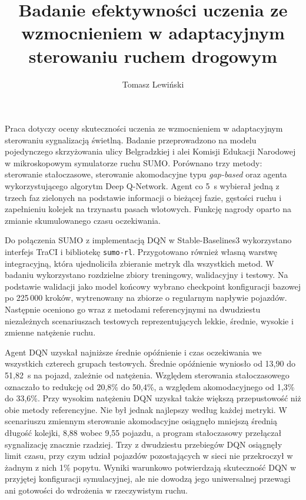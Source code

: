 \documentclass[
    bindingoffset=5mm,  %
    footnoteindent=3mm, %
    hyphenation=true    %
]{src/wut-thesis}
\begin{document}
\title{
    Badanie efektywności uczenia ze wzmocnieniem w adaptacyjnym sterowaniu ruchem drogowym
}

\author{Tomasz Lewiński}
\date{\the\year}
\maketitle

\cleardoublepage %
\abstract
Praca dotyczy oceny skuteczności uczenia ze wzmocnieniem w adaptacyjnym sterowaniu sygnalizacją świetlną. Badanie przeprowadzono na modelu pojedynczego skrzyżowania ulicy Belgradzkiej i alei Komisji Edukacji Narodowej w mikroskopowym symulatorze ruchu SUMO. Porównano trzy metody: sterowanie stałoczasowe, sterowanie akomodacyjne typu \textit{gap-based} oraz agenta wykorzystującego algorytm Deep Q-Network. Agent co 5~s wybierał jedną z trzech faz zielonych na podstawie informacji o bieżącej fazie, gęstości ruchu i zapełnieniu kolejek na trzynastu pasach wlotowych. Funkcję nagrody oparto na zmianie skumulowanego czasu oczekiwania.

Do połączenia SUMO z implementacją DQN w Stable-Baselines3 wykorzystano interfejs TraCI i bibliotekę \texttt{sumo-rl}. Przygotowano również własną warstwę integracyjną, która ujednoliciła zbieranie metryk dla wszystkich metod. W badaniu wykorzystano rozdzielne zbiory treningowy, walidacyjny i testowy. Na podstawie walidacji jako model końcowy wybrano checkpoint konfiguracji bazowej po 225\,000 kroków, wytrenowany na zbiorze o regularnym napływie pojazdów. Następnie oceniono go wraz z metodami referencyjnymi na dwudziestu niezależnych scenariuszach testowych reprezentujących lekkie, średnie, wysokie i zmienne natężenie ruchu.

Agent DQN uzyskał najniższe średnie opóźnienie i czas oczekiwania we wszystkich czterech grupach testowych. Średnie opóźnienie wyniosło od 13,90 do 51,82~s na pojazd, zależnie od natężenia. Względem sterowania stałoczasowego oznaczało to redukcję od 20,8\% do 50,4\%, a względem akomodacyjnego od 1,3\% do 33,6\%. Przy wysokim natężeniu DQN uzyskał także większą przepustowość niż obie metody referencyjne. Nie był jednak najlepszy według każdej metryki. W scenariuszu zmiennym sterowanie akomodacyjne osiągnęło mniejszą średnią długość kolejki, 8,88 wobec 9,55 pojazdu, a program stałoczasowy przełączał sygnalizację znacznie rzadziej. Trzy z dwudziestu przebiegów DQN osiągnęły limit czasu, przy czym udział pojazdów pozostających w sieci nie przekroczył w żadnym z nich 1\% popytu. Wyniki warunkowo potwierdzają skuteczność DQN w przyjętej konfiguracji symulacyjnej, ale nie dowodzą jego uniwersalnej przewagi ani gotowości do wdrożenia w rzeczywistym ruchu.
\end{document}
